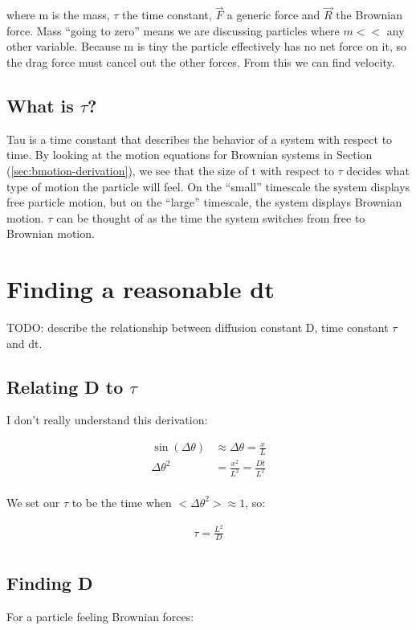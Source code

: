 \documentclass[10pt]{article} %
\begin{document}
where m is the mass, $\tau$ the time constant, $\vec{F}$ a generic force and $\vec{R}$ the Brownian
force. Mass ``going to zero'' means we are discussing particles where $m << $ any other variable.
Because m is tiny the particle effectively has no net force on it, so the drag force must cancel
out the other forces. From this we can find velocity.\\

\subsection{What is $\tau$?}
Tau is a time constant that describes the behavior of a system with respect to time. By looking at
the motion equations for Brownian systems in Section (\ref{sec:bmotion-derivation}), we see that the
size of t with respect to $\tau$ decides what type of motion the particle will feel. On the ``small''
timescale the system displays free particle motion, but on the ``large'' timescale, the system
displays Brownian motion. $\tau$ can be thought of as the time the system switches from free to
Brownian motion.\\

\section{Finding a reasonable dt}
TODO: describe the relationship between diffusion constant D, time constant $\tau$ and dt.\\

\subsection{Relating D to $\tau$}

I don't really understand this derivation:

\begin{align*}
  \sin\left(\Delta\theta\right) &\approx \Delta\theta = \frac{x}{L}\\
  \Delta\theta^2 &= \frac{x^2}{L^2} = \frac{Dt}{L^2}\\
\end{align*}

We set our $\tau$ to be the time when $<\Delta\theta^2> \approx 1$, so:

\begin{align*}
  \tau = \frac{L^2}{D}\\
\end{align*}

\subsection{Finding D}
For a particle feeling Brownian forces:
\end{document}
